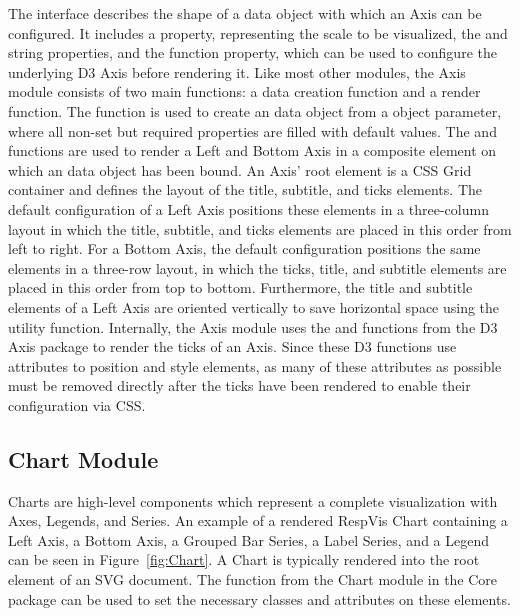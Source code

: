 The  interface describes the shape of a data object with
which an Axis can be configured. It includes a  property,
representing the scale to be visualized, the  and
 string properties, and the 
function property, which can be used to configure the underlying D3
Axis before rendering it. Like most other modules, the Axis module
consists of two main functions: a data creation function and a render
function. The  function is used to create an
 data object from a  object parameter,
where all non-set but required properties are filled with default
values. The  and 
functions are used to render a Left and Bottom Axis in a composite
element on which an  data object has been bound. An Axis'
root element is a CSS Grid container and defines the layout of the
title, subtitle, and ticks elements. The default configuration of a
Left Axis positions these elements in a three-column layout in which
the title, subtitle, and ticks elements are placed in this order from
left to right. For a Bottom Axis, the default configuration positions
the same elements in a three-row layout, in which the ticks, title,
and subtitle elements are placed in this order from top to bottom.
Furthermore, the title and subtitle elements of a Left Axis are
oriented vertically to save horizontal space using the
 utility function. Internally, the Axis module
uses the  and  functions from the D3
Axis package \parencite{D3Axis} to render the ticks of an Axis. Since
these D3 functions use attributes to position and style elements, as
many of these attributes as possible must be removed directly after
the ticks have been rendered to enable their configuration via CSS.






\subsection{Chart Module}
\label{sec:Chart}

Charts are high-level components which represent a complete
visualization with Axes, Legends, and Series. An example of a rendered
RespVis Chart containing a Left Axis, a Bottom Axis, a Grouped Bar
Series, a Label Series, and a Legend can be seen in
Figure~\ref{fig:Chart}. A Chart is typically rendered into the root
 element of an SVG document. The 
function from the  Chart module in the Core
package can be used to set the necessary classes and attributes on
these  elements.


